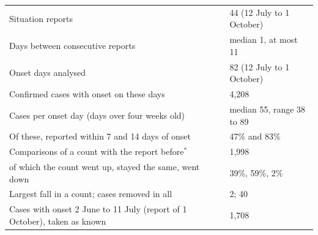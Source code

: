 \begin{tabular}{ll}
\toprule
Situation reports & 44 (12 July to 1 October) \\
Days between consecutive reports & median 1, at most 11 \\
Onset days analysed & 82 (12 July to 1 October) \\
Confirmed cases with onset on these days & 4,208 \\
Cases per onset day (days over four weeks old) & median 55, range 38 to 89 \\
Of these, reported within 7 and 14 days of onset & 47\% and 83\% \\
Comparisons of a count with the report before$^{*}$ & 1,998 \\
\quad of which the count went up, stayed the same, went down & 39\%, 59\%, 2\% \\
Largest fall in a count; cases removed in all & 2; 40 \\
Cases with onset 2 June to 11 July (report of 1 October), taken as known & 1,708 \\
\bottomrule
\end{tabular}
